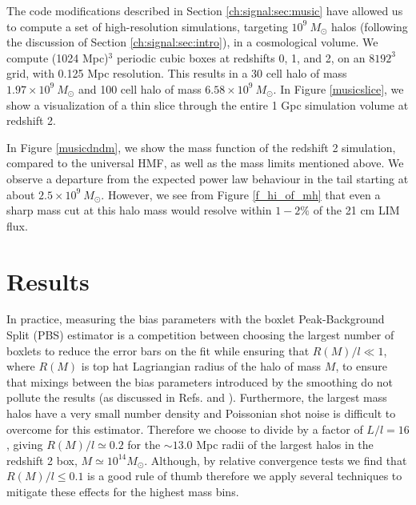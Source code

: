 The code modifications described in Section \ref{ch:signal:sec:music} have allowed us to compute a set of high-resolution simulations, targeting $10^9~M_\odot$ halos (following the discussion of Section \ref{ch:signal:sec:intro}), in a cosmological volume. We compute (1024 Mpc)$^3$ periodic cubic boxes at redshifts 0, 1, and 2, on an $8192^3$ grid, with 0.125 Mpc resolution. This results in a 30 cell halo of mass $1.97 \times 10^{9}~M_\odot$ and 100 cell halo of mass $6.58 \times 10^{9}~M_\odot$. In Figure \ref{musicslice}, we show a visualization of a thin slice through the entire 1 Gpc simulation volume at redshift 2.

In Figure \ref{musicdndm}, we show the mass function of the redshift 2 simulation, compared to the \citeauthor{tinker2008} universal HMF, as well as the mass limits mentioned above. We observe a departure from the expected power law behaviour in the tail starting at about $2.5 \times 10^{9}~M_\odot$. However, we see from Figure \ref{f_hi_of_mh} that even a sharp mass cut at this halo mass would resolve within $1-2 \%$ of the 21 cm LIM flux.

\section{Results}
\label{ch:signal:sec:results}

In practice, measuring the bias parameters with the boxlet Peak-Background Split (PBS) estimator is a competition between choosing the largest number of boxlets to reduce the error bars on the fit while ensuring that $R(M)/l \ll 1$, where $R(M)$ is top hat Lagriangian radius of the halo of mass $M$, to ensure that mixings between the bias parameters introduced by the smoothing do not pollute the results (as discussed in Refs. \citep{biasreview} and \citep{modietal2017}). Furthermore, the largest mass halos  have a very small number density and Poissonian shot noise is difficult to overcome for this estimator. Therefore we choose to divide by a factor of $L/l = 16$, giving $R(M)/l \simeq 0.2$ for the $\sim 13.0$ Mpc radii of the largest halos in the redshift 2 box, $M \simeq 10^{14} M_\odot$. Although, by relative convergence tests we find that $R(M)/l \leq 0.1$ is a good rule of thumb therefore we apply several techniques to mitigate these effects for the highest mass bins.

